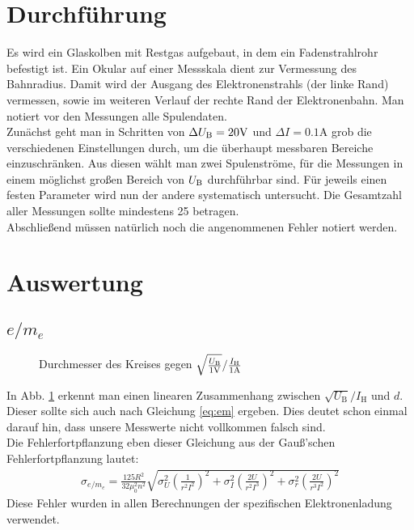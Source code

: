 \documentclass[12pt,a4paper,titlepage,headinclude,bibtotoc]{scrartcl}
\numberwithin{equation}{section}
\begin{document}
\section{Durchführung}
\label{sec:durchfuehrung}
Es wird ein Glaskolben mit Restgas aufgebaut, in dem ein Fadenstrahlrohr befestigt ist.
Ein Okular auf einer Messskala dient zur Vermessung des Bahnradius.
Damit wird der Ausgang des Elektronenstrahls (der linke Rand) vermessen, sowie im weiteren Verlauf der rechte Rand der Elektronenbahn.
Man notiert vor den Messungen alle Spulendaten.\\
Zunächst geht man in Schritten von $\Delta U_\text B=20\si{\volt}$ und $\Delta I=0.1\si{\ampere}$ grob die verschiedenen Einstellungen durch, um die überhaupt messbaren Bereiche einzuschränken.
Aus diesen wählt man zwei Spulenströme, für die Messungen in einem möglichst großen Bereich von $U_\text B$ durchführbar sind.
Für jeweils einen festen Parameter wird nun der andere systematisch untersucht.
Die Gesamtzahl aller Messungen sollte mindestens 25 betragen.\\
Abschließend müssen natürlich noch die angenommenen Fehler notiert werden.




\section{Auswertung}
\label{sec:auswertung}
\subsection{$e/m_e$}
\begin{figure}[!h]
	\centering
	
	\caption{Durchmesser des Kreises gegen $\sqrt{\frac{U_\text{B}}{1\text V}}/\frac{I_\text{H}}{1\text A}$}
	\label{fig:UI}
\end{figure}

In Abb. \ref{fig:UI} erkennt man einen linearen Zusammenhang zwischen $\sqrt{U_\text{B}}/I_\text{H}$ und $d$.
Dieser sollte sich auch nach Gleichung \eqref{eq:em} ergeben.
Dies deutet schon einmal darauf hin, dass unsere Messwerte nicht vollkommen falsch sind.\\
Die Fehlerfortpflanzung eben dieser Gleichung aus der Gauß'schen Fehlerfortpflanzung lautet:
\begin{align}
\sigma_{e/m_e}=\frac{125R^2}{32\mu_0^{2}n^2}\sqrt{\sigma_{U}^2\left( \frac{1}{r^2I^2} \right)^2+\sigma_I^2\left( \frac{2U}{r^2I^3} \right)^2+\sigma_r^2\left( \frac{2U}{r^3I^2} \right)^2}
\label{eq:sigmaEdM}
\end{align}
Diese Fehler wurden in allen Berechnungen der spezifischen Elektronenladung verwendet.
\end{document}
